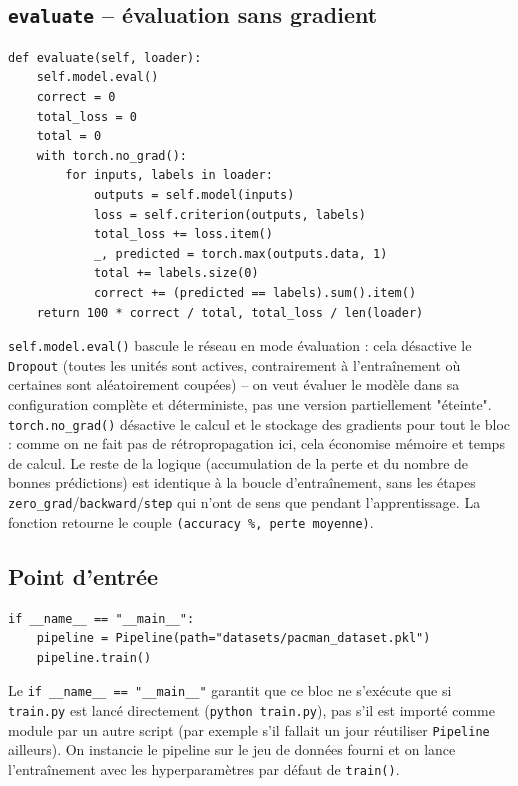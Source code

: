 \documentclass[a4paper,12pt]{article}
\begin{document}
\subsection{\texttt{evaluate} -- évaluation sans gradient}

\begin{lstlisting}
def evaluate(self, loader):
    self.model.eval()
    correct = 0
    total_loss = 0
    total = 0
    with torch.no_grad():
        for inputs, labels in loader:
            outputs = self.model(inputs)
            loss = self.criterion(outputs, labels)
            total_loss += loss.item()
            _, predicted = torch.max(outputs.data, 1)
            total += labels.size(0)
            correct += (predicted == labels).sum().item()
    return 100 * correct / total, total_loss / len(loader)
\end{lstlisting}

\texttt{self.model.eval()} bascule le réseau en mode évaluation : cela
désactive le \texttt{Dropout} (toutes les unités sont actives,
contrairement à l'entraînement où certaines sont aléatoirement coupées)
-- on veut évaluer le modèle dans sa configuration complète et
déterministe, pas une version partiellement "éteinte".
\texttt{torch.no\_grad()} désactive le calcul et le stockage des
gradients pour tout le bloc : comme on ne fait pas de rétropropagation
ici, cela économise mémoire et temps de calcul. Le reste de la logique
(accumulation de la perte et du nombre de bonnes prédictions) est
identique à la boucle d'entraînement, sans les étapes
\texttt{zero\_grad}/\texttt{backward}/\texttt{step} qui n'ont de sens que
pendant l'apprentissage. La fonction retourne le couple
\texttt{(accuracy \%, perte moyenne)}.

\subsection{Point d'entrée}

\begin{lstlisting}
if __name__ == "__main__":
    pipeline = Pipeline(path="datasets/pacman_dataset.pkl")
    pipeline.train()
\end{lstlisting}

Le \texttt{if \_\_name\_\_ == "\_\_main\_\_"} garantit que ce bloc ne
s'exécute que si \texttt{train.py} est lancé directement (\texttt{python
train.py}), pas s'il est importé comme module par un autre script (par
exemple s'il fallait un jour réutiliser \texttt{Pipeline} ailleurs). On
instancie le pipeline sur le jeu de données fourni et on lance
l'entraînement avec les hyperparamètres par défaut de \texttt{train()}.
\end{document}
